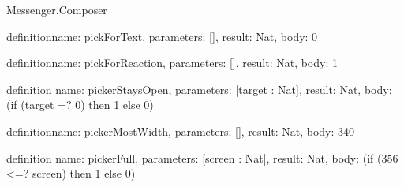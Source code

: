 \begin{lexlean}{Messenger.Composer}
\begin{semanticmodule}
definition{name: pickForText, parameters: [], result: Nat, body: 0}

definition{name: pickForReaction, parameters: [], result: Nat, body: 1}

definition{
  name: pickerStaysOpen,
  parameters: [target : Nat],
  result: Nat,
  body: (if (target =? 0) then 1 else 0)
}

definition{name: pickerMostWidth, parameters: [], result: Nat, body: 340}

definition{
  name: pickerFull,
  parameters: [screen : Nat],
  result: Nat,
  body: (if (356 <=? screen) then 1 else 0)
}
\end{semanticmodule}
\end{lexlean}
